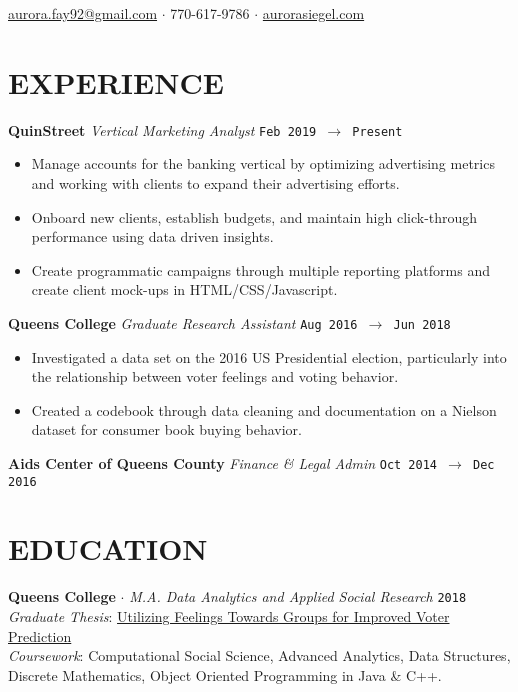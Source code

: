 \documentclass[margin, line, 11pt]{res}
\begin{document}
\noindent\hspace{-1.0in}{\LARGE\bf Aurora Siegel}
\hfill \href{mailto:aurora.fay92@gmail.com}{aurora.fay92@gmail.com}
$\cdot$ 770-617-9786
$\cdot$ \href{http://aurorasiegel.com}{aurorasiegel.com}

\begin{resume}

\section{EXPERIENCE}

{\bf QuinStreet}\vspace{0.04in} {\it Vertical Marketing Analyst} \hfill\texttt{Feb 2019 $\to$ Present}\vspace{0.04in}
\begin{itemize}
\item Manage accounts for the banking vertical by optimizing advertising metrics and working with clients to expand their advertising efforts.
\item Onboard new clients, establish budgets, and maintain high click-through performance using data driven insights.
\item Create programmatic campaigns through multiple reporting platforms and create client mock-ups in HTML/CSS/Javascript.
\end{itemize}

{\bf Queens College} {\it Graduate Research Assistant} \hfill\texttt{Aug 2016 $\to$ Jun 2018}\vspace{0.04in}
\begin{itemize}
\item Investigated a data set on the 2016 US Presidential election, particularly into the relationship between voter feelings and voting behavior.
\item Created a codebook through data cleaning and documentation on a Nielson dataset for consumer book buying behavior.
\end{itemize}

{\bf Aids Center of Queens County} {\it Finance \& Legal Admin} \hfill\texttt{Oct 2014 $\to$ Dec 2016}\vspace{0.04in}

\section{EDUCATION}

{\bf Queens College} $\cdot$ {\it M.A. Data Analytics and Applied Social Research} \hfill \texttt{2018}
\\{\it Graduate Thesis}: \href{https://github.com/aurorasiegel/feelings}{Utilizing Feelings Towards Groups for Improved Voter Prediction}
\\{\it Coursework}: Computational Social Science, Advanced Analytics, Data Structures, Discrete 
Mathematics, Object Oriented Programming in Java \& C++.


\end{resume}
\end{document}
